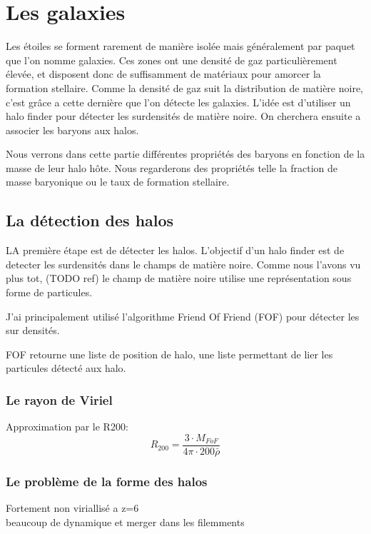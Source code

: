 \chapter{Les galaxies}

Les étoiles se forment rarement de manière isolée mais généralement par paquet que l'on nomme galaxies.
Ces zones ont une densité de gaz particulièrement élevée, et disposent donc de suffisamment de matériaux pour amorcer la formation stellaire.
Comme la densité de gaz suit la distribution de matière noire, c'est grâce a cette dernière que l'on détecte les galaxies.
L'idée est d'utiliser un halo finder pour détecter les surdensités de matière noire.
On cherchera ensuite a associer les baryons aux halos.

Nous verrons dans cette partie différentes propriétés des baryons en fonction de la masse de leur halo hôte.
Nous regarderons des propriétés telle la fraction de masse baryonique ou le taux de formation stellaire.





\section{La détection des halos}
LA première étape est de détecter les halos.
L'objectif d'un halo finder est de detecter les surdensités dans le champs de matière noire.
Comme nous l'avons vu plus tot, (TODO ref) le champ de matière noire utilise une représentation sous forme de particules.

J'ai principalement utilisé l’algorithme Friend Of Friend (FOF) pour détecter les sur densités.

FOF retourne une liste de position de halo, une liste permettant de lier les particules détecté aux halo.

\subsection{Le rayon de Viriel}
Approximation par le R200:
\begin{equation}
R_{200}=\frac{3\cdot M_{FoF} }{4\pi\cdot 200 \bar{\rho} }
\end{equation}


\subsection{Le problème de la forme des halos}
Fortement non viriallisé a z=6\\
beaucoup de dynamique et merger dans les filemments

